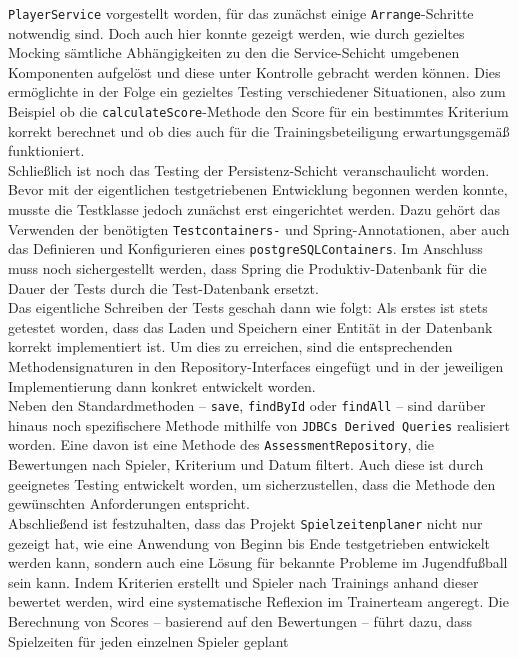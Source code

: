 \texttt{PlayerService} vorgestellt worden, für das zunächst einige 
\texttt{Arrange}-Schritte notwendig sind. Doch auch hier konnte gezeigt werden, wie 
durch gezieltes Mocking sämtliche Abhängigkeiten zu den die Service-Schicht umgebenen 
Komponenten aufgelöst und diese unter Kontrolle gebracht werden können. Dies ermöglichte 
in der Folge ein gezieltes Testing verschiedener Situationen, also zum Beispiel ob die 
\texttt{calculateScore}-Methode den Score für ein bestimmtes Kriterium korrekt berechnet 
und ob dies auch für die Trainingsbeteiligung erwartungsgemäß funktioniert. \\ 
Schließlich ist noch das Testing der Persistenz-Schicht veranschaulicht worden. Bevor 
mit der eigentlichen testgetriebenen Entwicklung begonnen werden konnte, musste die 
Testklasse jedoch zunächst erst eingerichtet werden. Dazu gehört das Verwenden der 
benötigten \texttt{Testcontainers-} und Spring-Annotationen, aber auch das Definieren 
und Konfigurieren eines \texttt{postgreSQLContainers}. Im Anschluss muss noch 
sichergestellt werden, dass Spring die Produktiv-Datenbank für die Dauer der Tests 
durch die Test-Datenbank ersetzt. \\ 
Das eigentliche Schreiben der Tests geschah dann wie folgt: Als erstes ist stets getestet 
worden, dass das Laden und Speichern einer Entität in der Datenbank korrekt implementiert 
ist. Um dies zu erreichen, sind die entsprechenden Methodensignaturen in den 
Repository-Interfaces eingefügt und in der jeweiligen Implementierung dann konkret 
entwickelt worden. \\ 
Neben den Standardmethoden -- \texttt{save}, \texttt{findById} oder \texttt{findAll} -- 
sind darüber hinaus noch spezifischere Methode mithilfe von 
\texttt{JDBCs Derived Queries} realisiert worden. Eine davon ist eine Methode des 
\texttt{AssessmentRepository}, die Bewertungen nach Spieler, Kriterium und Datum 
filtert. Auch diese ist durch geeignetes Testing entwickelt worden, um sicherzustellen, 
dass die Methode den gewünschten Anforderungen entspricht. \\ 
Abschließend ist festzuhalten, dass das Projekt \texttt{Spielzeitenplaner} nicht nur 
gezeigt hat, wie eine Anwendung von Beginn bis Ende testgetrieben entwickelt werden kann, 
sondern auch eine Lösung für bekannte Probleme im Jugendfußball sein kann. Indem  
Kriterien erstellt und Spieler nach Trainings anhand dieser bewertet werden, wird eine 
systematische Reflexion im Trainerteam angeregt. Die Berechnung von Scores -- basierend 
auf den Bewertungen -- führt dazu, dass Spielzeiten für jeden einzelnen Spieler geplant 
